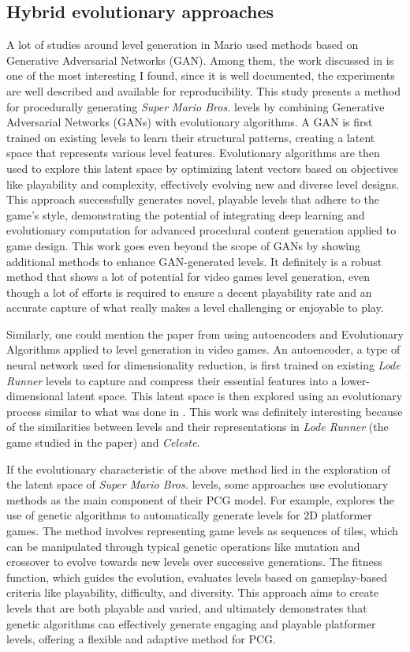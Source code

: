 \documentclass{article}
\newcommand{\Celnosp}{\textit{Celeste}}
\begin{document}
\subsection{Hybrid evolutionary approaches}
A lot of studies around level generation in Mario used methods based on Generative Adversarial Networks (GAN). Among them, the work discussed in \cite{volz} is one of the most interesting I found, since it is well documented, the experiments are well described and available for reproducibility. This study presents a method for procedurally generating \textit{Super Mario Bros.} levels by combining Generative Adversarial Networks (GANs) with evolutionary algorithms. A GAN is first trained on existing levels to learn their structural patterns, creating a latent space that represents various level features. Evolutionary algorithms are then used to explore this latent space by optimizing latent vectors based on objectives like playability and complexity, effectively evolving new and diverse level designs. This approach successfully generates novel, playable levels that adhere to the game's style, demonstrating the potential of integrating deep learning and evolutionary computation for advanced procedural content generation applied to game design. This work goes even beyond the scope of GANs by showing additional methods to enhance GAN-generated levels. It definitely is a robust method that shows a lot of potential for video games level generation, even though a lot of efforts is required to ensure a decent playability rate and an accurate capture of what really makes a level challenging or enjoyable to play.

\noindent Similarly, one could mention the paper from \cite{EA} using autoencoders and Evolutionary Algorithms applied to level generation in video games. An autoencoder, a type of neural network used for dimensionality reduction, is first trained on existing \textit{Lode Runner} levels to capture and compress their essential features into a lower-dimensional latent space. This latent space is then explored using an evolutionary process similar to what was done in \cite{volz}. This work was definitely interesting because of the similarities between levels and their representations in \textit{Lode Runner} (the game studied in the paper) and \Celnosp.

\noindent If the evolutionary characteristic of the above method lied in the exploration of the latent space of \textit{Super Mario Bros.} levels, some approaches use evolutionary methods as the main component of their PCG model. For example, \cite{GA} explores the use of genetic algorithms to automatically generate levels for 2D platformer games. The method involves representing game levels as sequences of tiles, which can be manipulated through typical genetic operations like mutation and crossover to evolve towards new levels over successive generations. The fitness function, which guides the evolution, evaluates levels based on gameplay-based criteria like playability, difficulty, and diversity. This approach aims to create levels that are both playable and varied, and ultimately demonstrates that genetic algorithms can effectively generate engaging and playable platformer levels, offering a flexible and adaptive method for PCG.
\end{document}
